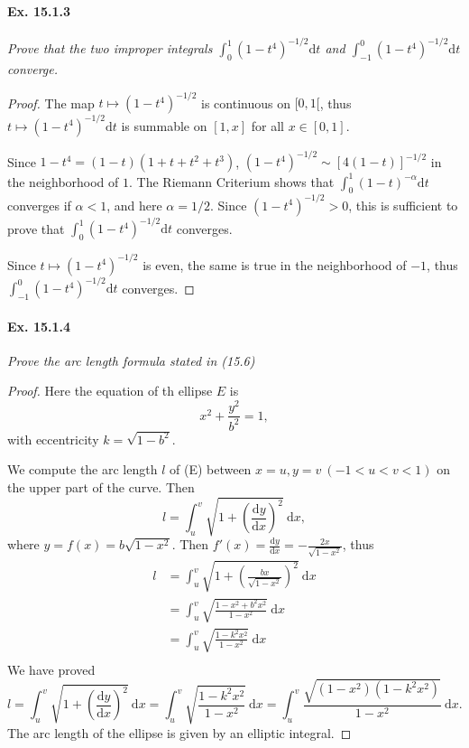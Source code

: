 \documentclass[11pt,a4paper]{article}
\newcommand{\D}{\mathrm{d}}
\begin{document}
\paragraph{Ex. 15.1.3}{\it Prove that the two improper integrals $\int_0^1 (1-t^4)^{-1/2} \mathrm{d}t$ and $\int_{-1}^0 (1-t^4)^{-1/2} \mathrm{d}t$ converge.
}
\begin{proof}
 The map $t \mapsto (1-t^4)^{-1/2}$ is continuous on $[0,1[$, thus $t \mapsto(1-t^4)^{-1/2} \mathrm{d}t$ is summable on $[1,x]$ for all $x \in [0,1]$.  

Since $1-t^4 = (1-t)(1+t+t^2+t^3)$, $(1-t^4)^{-1/2} \sim [4(1-t)]^{-1/2}$ in the neighborhood of $1$. The Riemann Criterium shows that $\int_0^1 (1-t)^{-\alpha} \mathrm{d}t$ converges if  $\alpha  < 1$, and here $\alpha = 1/2$. Since $(1-t^4)^{-1/2} >0$, this is sufficient to prove that $\int_0^1 (1-t^4)^{-1/2} \mathrm{d}t$ converges.

Since $t \mapsto (1-t^4)^{-1/2}$ is even, the same is true in the neighborhood of $-1$, thus $\int_{-1}^0 (1-t^4)^{-1/2} \mathrm{d}t$ converges.
\end{proof}

\paragraph{Ex. 15.1.4}{\it  Prove the arc length formula stated in (15.6)}
\begin{proof}
 Here the equation of th ellipse $E$ is
 $$x^2 + \frac{y^2}{b^2} = 1,$$
 with eccentricity $k = \sqrt{1- b^2}$.

We compute the arc length $l$ of (E) between $x = u, y=v\ (-1<u<v<1)$ on the upper part of the curve. Then
$$l =  \int_u^v \sqrt{1+\left( \frac{\D y}{\D x}\right)^2}\  \D x,$$
where $y = f(x) = b \sqrt{1-x^2}.$ Then $f'(x) =  \frac{\D y}{\D x }= -\frac{2x}{\sqrt{1-x^2}}$, thus
\begin{align*}
l &=  \int_u^v \sqrt{1+\left(\frac{bx}{\sqrt{1-x^2}}\right)^2}\  \D x\\
&=\int_u^v \sqrt{\frac{1 - x^2 + b^2 x^2}{1-x^2}}\  \D x\\
&=\int_u^v \sqrt{\frac{1 - k^2 x^2}{1-x^2}}\  \D x\\
\end{align*}
We have proved
$$l =  \int_u^v \sqrt{1+\left( \frac{\D y}{\D x}\right)^2}\  \D x = \int_u^v \sqrt{\frac{1 - k^2 x^2}{1-x^2}}\  \D x = \int_u^v \frac{\sqrt{(1-x^2)(1 - k^2 x^2)}}{1-x^2}\  \D x.$$
The arc length of the ellipse is given by an elliptic integral.
\end{proof}
\end{document}
